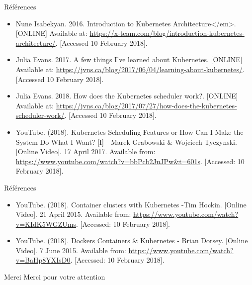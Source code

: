 \documentclass{bredelebeamer}
\begin{document}
\begin{frame}{Références}
\begin{itemize}
\item Nune Isabekyan. 2016. Introduction to Kubernetes Architecture</em>. [ONLINE] Available at: \url{https://x-team.com/blog/introduction-kubernetes-architecture/}. [Accessed 10 February 2018].
\item Julia Evans. 2017. A few things I've learned about Kubernetes. [ONLINE] Available at: \url{https://jvns.ca/blog/2017/06/04/learning-about-kubernetes/}. [Accessed 10 February 2018].
\item Julia Evans. 2018. How does the Kubernetes scheduler work?. [ONLINE] Available at: \url{https://jvns.ca/blog/2017/07/27/how-does-the-kubernetes-scheduler-work/}. [Accessed 10 February 2018].
\item YouTube. (2018). Kubernetes Scheduling Features or How Can I Make the System Do What I Want? [I] - Marek Grabowski \& Wojciech Tyczynski. [Online Video]. 17 April 2017. Available from: \url{https://www.youtube.com/watch?v=bbPcb2JuJPw&t=601s}. [Accessed: 10 February 2018].
\end{itemize}
\end{frame}


\begin{frame}{Références}
\begin{itemize}

\item YouTube. (2018). Container clusters with Kubernetes -Tim Hockin. [Online Video]. 21 April 2015. Available from: \url{https://www.youtube.com/watch?v=KIdK5WGZUms}. [Accessed: 10 February 2018].
\item YouTube. (2018). Dockers Containers \& Kubernetes - Brian Dorsey. [Online Video]. 7 June 2015. Available from: \url{https://www.youtube.com/watch?v=BaHp8YXIsD0}. [Accessed: 10 February 2018].
\end{itemize}
\end{frame}

\begin{frame}{Merci}
\centering
Merci pour votre attention
\end{frame}
\end{document}
